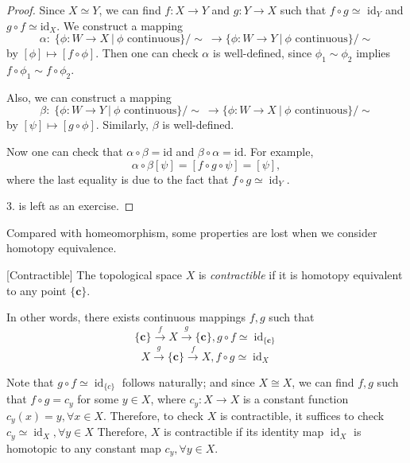 \begin{proof} Since \(X \simeq  Y\), we can find \(f : X \rightarrow  Y\) and \(g : Y \rightarrow  X\) such that \(f \circ  g \simeq\)  \({\mathrm{{id}}}_{Y}\) and \(g \circ  f \simeq  {\mathrm{{id}}}_{X}\). We construct a mapping
\[\alpha  : \;\{ \phi  : W \rightarrow  X\ | \ \phi \text{ continuous}\} / \sim \ \longrightarrow  \{ \phi  : W \rightarrow  Y\ | \ \phi \text{ continuous}\} / \sim\]
by \(\left\lbrack  \phi \right\rbrack   \mapsto  \left\lbrack  {f \circ  \phi }\right\rbrack\). Then one can check \(\alpha\) is well-defined, since \({\phi }_{1} \sim  {\phi }_{2}\) implies \(f \circ  {\phi }_{1} \sim  f \circ  {\phi }_{2}\).

Also, we can construct a mapping
\[\beta  : \;\{ \phi  :W \rightarrow  Y\ | \ \phi \text{ continuous}\} / \sim \  \longrightarrow  \{ \phi  :W \rightarrow  X\ | \ \phi \text{ continuous}\} / \sim\]
by \(\left\lbrack  \psi \right\rbrack   \mapsto  \left\lbrack  {g \circ  \phi }\right\rbrack\). Similarly, \(\beta\) is well-defined.

Now one can check that \(\alpha  \circ  \beta  = \mathrm{{id}}\) and \(\beta  \circ  \alpha  = \mathrm{{id}}\). For example, 
\[
\alpha  \circ  \beta \left\lbrack  \psi \right\rbrack   = \left\lbrack  {f \circ  g \circ  \psi }\right\rbrack   = \left\lbrack  \psi \right\rbrack , 
\]
where the last equality is due to the fact that \(f \circ  g \simeq  {\operatorname{id}}_{Y}\).

3. is left as an exercise.
\end{proof}

Compared with homeomorphism, some properties are lost when we consider homotopy equivalence.
\begin{definition} \label{def:contractible} [Contractible] The topological space \(X\) is \emph{contractible} if it is homotopy equivalent to any point \(\{ \mathbf{c}\}\).

In other words, there exists continuous mappings \(f, g\) such that
\[
\{ \mathbf{c}\} \overset{f}{ \rightarrow  }X\overset{g}{ \rightarrow  }\{ \mathbf{c}\}, g \circ  f \simeq  {\operatorname{id}}_{\{ \mathbf{c}\} }
\]
\[
X\overset{g}{ \rightarrow  }\{ \mathbf{c}\} \overset{f}{ \rightarrow  }X, f \circ  g \simeq  {\operatorname{id}}_{X}
\]
\end{definition}

Note that \(g \circ  f \simeq  {\operatorname{id}}_{\{ c\} }\) follows naturally; and since \(X \cong  X\), we can find \(f, g\) such that \(f \circ  g = {c}_{y}\) for some \(y \in  X\), where \({c}_{y} : X \rightarrow  X\) is a constant function \({c}_{y}\left( x\right)  = y, \forall x \in  X\). Therefore, to check \(X\) is contractible, it suffices to check \({c}_{y} \simeq  {\operatorname{id}}_{X}, \forall y \in  X\) Therefore, \(X\) is contractible if its identity map \({\operatorname{id}}_{X}\) is homotopic to any constant map \({c}_{y}, \forall y \in  X\).

